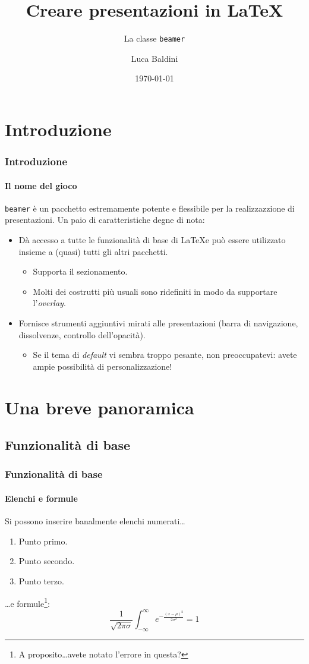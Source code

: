 \documentclass{beamer}
\title{Creare presentazioni in \LaTeX}
\subtitle{La classe {\tt beamer}}
\author{Luca Baldini}
\institute{Gruppo Utilizzatoti Italiani di \TeX}
\date{\today}
\begin{document}
\begin{frame}
  \titlepage
\end{frame}


\section[Sommario]{}
\begin{frame}
  \tableofcontents
\end{frame}


\section{Introduzione}
\begin{frame}
  \frametitle{Introduzione}
  \framesubtitle{Il nome del gioco}
  {\tt beamer} \`e un pacchetto estremamente potente e flessibile per
  la realizzazzione di presentazioni. Un paio di caratteristiche degne di nota:
  \begin{itemize}
  \item D\`a accesso a tutte le funzionalit\`a di base di \LaTeX e pu\`o
    essere utilizzato insieme a (quasi) tutti gli altri pacchetti.
    \begin{itemize}
    \item Supporta il sezionamento.
    \item Molti dei costrutti pi\`u usuali sono ridefiniti in modo da
      supportare l'\emph{overlay}.
    \end{itemize}
  \item Fornisce strumenti aggiuntivi mirati alle presentazioni (barra di
    navigazione, dissolvenze, controllo dell'opacit\`a).
    \begin{itemize}
    \item Se il tema di \emph{default} vi sembra troppo pesante, non
      preoccupatevi: avete ampie possibilit\`a di personalizzazione!
    \end{itemize}
\end{itemize}
\end{frame}


\section{Una breve panoramica}
\subsection{Funzionalit\`a di base}
\begin{frame}
  \frametitle{Funzionalit\`a di base}
  \framesubtitle{Elenchi e formule}
  Si possono inserire banalmente elenchi numerati\ldots
  \begin{enumerate}
  \item Punto primo.
  \item Punto secondo.
  \item Punto terzo.
  \end{enumerate}

  \ldots e formule\footnote{A proposito\ldots avete notato l'errore
    in questa?}:
  $$
  \frac{1}{\sqrt{2\pi \sigma}} \int_{-\infty}^{\infty}
  e^{-\frac{(x-\mu)^2}{2\sigma^2}} = 1
  $$
\end{frame}
\end{document}
